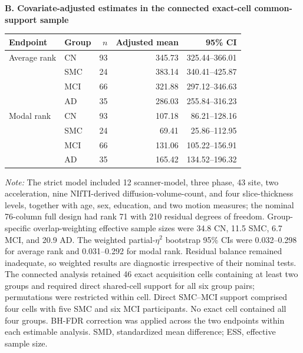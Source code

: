 \documentclass{article}
\providecommand{\DIFaddtex}[1]{{\protect\color{blue}#1}} %
\providecommand{\DIFaddFL}[1]{\DIFadd{#1}} %
\providecommand{\DIFadd}[1]{\texorpdfstring{\DIFaddtex{#1}}{#1}} %
\begin{document}
\begin{table}[!htbp]
\DIFaddFL{\textbf{B. Covariate-adjusted estimates in the connected exact-cell common-support sample}}\par\vspace{1mm}
\begin{tabular}{llrrr}
\toprule
\DIFaddFL{Endpoint }& \DIFaddFL{Group }& \DIFaddFL{$n$ }& \DIFaddFL{Adjusted mean }& \DIFaddFL{95\% CI}\\
\midrule
\DIFaddFL{Average rank }& \DIFaddFL{CN }& \DIFaddFL{93 }& \DIFaddFL{345.73 }& \DIFaddFL{325.44--366.01}\\
& \DIFaddFL{SMC }& \DIFaddFL{24 }& \DIFaddFL{383.14 }& \DIFaddFL{340.41--425.87}\\
& \DIFaddFL{MCI }& \DIFaddFL{66 }& \DIFaddFL{321.88 }& \DIFaddFL{297.12--346.63}\\
& \DIFaddFL{AD }& \DIFaddFL{35 }& \DIFaddFL{286.03 }& \DIFaddFL{255.84--316.23}\\
\addlinespace
\DIFaddFL{Modal rank }& \DIFaddFL{CN }& \DIFaddFL{93 }& \DIFaddFL{107.18 }& \DIFaddFL{86.21--128.16}\\
& \DIFaddFL{SMC }& \DIFaddFL{24 }& \DIFaddFL{69.41 }& \DIFaddFL{25.86--112.95}\\
& \DIFaddFL{MCI }& \DIFaddFL{66 }& \DIFaddFL{131.06 }& \DIFaddFL{105.22--156.91}\\
& \DIFaddFL{AD }& \DIFaddFL{35 }& \DIFaddFL{165.42 }& \DIFaddFL{134.52--196.32}\\
\bottomrule
\end{tabular}
\par\vspace{1mm}
\footnotesize{\textit{Note:} The strict model included 12 scanner-model, three phase, 43 site, two acceleration, nine NIfTI-derived diffusion-volume-count, and four slice-thickness levels, together with age, sex, education, and two motion measures; the nominal 76-column full design had rank 71 with 210 residual degrees of freedom. Group-specific overlap-weighting effective sample sizes were 34.8 CN, 11.5 SMC, 6.7 MCI, and 20.9 AD. The weighted partial-$\eta^2$ bootstrap 95\% CIs were 0.032--0.298 for average rank and 0.031--0.292 for modal rank. Residual balance remained inadequate, so weighted results are diagnostic irrespective of their nominal tests. The connected analysis retained 46 exact acquisition cells containing at least two groups and required direct shared-cell support for all six group pairs; permutations were restricted within cell. Direct SMC--MCI support comprised four cells with five SMC and six MCI participants. No exact cell contained all four groups. BH-FDR correction was applied across the two endpoints within each estimable analysis. SMD, standardized mean difference; ESS, effective sample size.}
\end{table}
\end{document}
